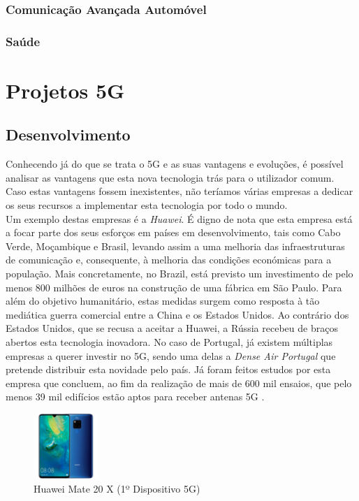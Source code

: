 \documentclass{llncs}
\begin{document}
\subsubsection{Comunicação Avançada Automóvel}
\subsubsection{Saúde}
\section{Projetos 5G}
\subsection{Desenvolvimento}
Conhecendo já do que se trata o 5G e as suas vantagens e evoluções,
é possível analisar as vantagens que esta nova tecnologia trás para
o utilizador comum.\\
Caso estas vantagens fossem inexistentes, não teríamos várias empresas
a dedicar os seus recursos a implementar esta tecnologia por todo o 
mundo.\\
Um exemplo destas empresas é a \textit{Huawei}.
É digno de nota que esta empresa está a focar parte dos seus esforços 
em países em desenvolvimento, tais como Cabo Verde, Moçambique e 
Brasil, levando assim a uma melhoria das infraestruturas de 
comunicação e, consequente, à melhoria das condições económicas para a
população. Mais concretamente, no Brazil, está previsto um
investimento de pelo menos 800 milhões de euros na construção de uma 
fábrica em São Paulo. Para além do objetivo humanitário, estas medidas
surgem como resposta à tão mediática guerra comercial entre a China e
os Estados Unidos.
Ao contrário dos Estados Unidos, que se recusa a aceitar a Huawei, a
Rússia recebeu de braços abertos esta tecnologia inovadora.
No caso de Portugal, já existem múltiplas empresas a querer investir
no 5G, sendo uma delas a \textit{Dense Air Portugal} que pretende
distribuir esta novidade pelo país.
Já foram feitos estudos por esta empresa que concluem, ao fim da
realização de mais de 600 mil ensaios, que pelo menos 39 mil edifícios
estão aptos para receber antenas 5G \cite{5GPortugal}.
\begin{figure}
  \centering
  \includegraphics[width=0.22\textwidth]{images/huawei.jpg}
  \caption{Huawei Mate 20 X (1º Dispositivo 5G)}
  \label{fig:thunderbolt}
\end{figure}
\end{document}
